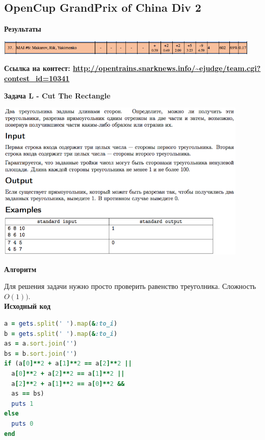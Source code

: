 \documentclass[a4paper,12pt]{article}
\begin{document}
%
%
\newpage
\subsection{OpenCup GrandPrix of China Div 2}

\textbf{{\large Результаты}} \\
\begin{center}
\includegraphics[width=0.95\textwidth]{OC_China_2016/result.png}\\ [1cm]
\end{center}

\textbf{{\large Ссылка на контест: \url{http://opentrains.snarknews.info/~ejudge/team.cgi?contest_id=10341}}}

\newpage
\textbf{{\large Задача L - Cut The Rectangle}}

\begin{center}
\includegraphics[width=0.9\textwidth]{OC_China_2016/L.png}\\ [1cm]
\end{center}

\textbf{{\large Алгоритм}}

Для решения задачи нужно просто проверить равенство треуголника. Сложность $O(1))$. \\

\textbf{{\large Исходный код}} \\
\begin{lstlisting}[language=Ruby]
a = gets.split(' ').map(&:to_i)
b = gets.split(' ').map(&:to_i)
as = a.sort.join('')
bs = b.sort.join('')
if (a[0]**2 + a[1]**2 == a[2]**2 ||
  a[0]**2 + a[2]**2 == a[1]**2 ||
  a[2]**2 + a[1]**2 == a[0]**2 &&
  as == bs)
  puts 1
else
  puts 0
end
\end{lstlisting}
\end{document}

